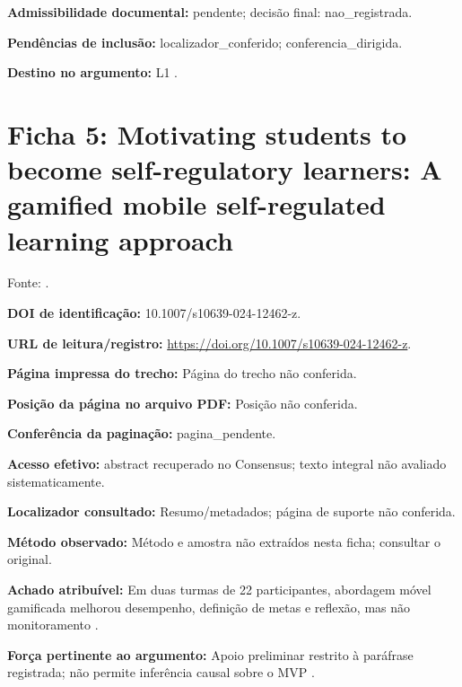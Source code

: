 \noindent\textbf{Admissibilidade documental:} pendente; decisão final: nao\_registrada.\par\medskip

\noindent\textbf{Pendências de inclusão:} localizador\_conferido; conferencia\_dirigida.\par\medskip

\noindent\textbf{Destino no argumento:} L1 .

\clearpage\section*{Ficha 5: Motivating students to become self-regulatory learners: A gamified mobile self-regulated learning approach}

Fonte: \citet{education_chen2024}.

\noindent\textbf{DOI de identificação:} 10.1007/s10639-024-12462-z.\par\medskip

\noindent\textbf{URL de leitura/registro:} \url{https://doi.org/10.1007/s10639-024-12462-z}.\par\medskip

\noindent\textbf{Página impressa do trecho:} Página do trecho não conferida.\par\medskip

\noindent\textbf{Posição da página no arquivo PDF:} Posição não conferida.\par\medskip

\noindent\textbf{Conferência da paginação:} pagina\_pendente.\par\medskip

\noindent\textbf{Acesso efetivo:} abstract recuperado no Consensus; texto integral não avaliado sistematicamente.\par\medskip

\noindent\textbf{Localizador consultado:} Resumo/metadados; página de suporte não conferida.\par\medskip

\noindent\textbf{Método observado:} Método e amostra não extraídos nesta ficha; consultar o original.\par\medskip

\noindent\textbf{Achado atribuível:} Em duas turmas de 22 participantes, abordagem móvel gamificada melhorou desempenho, definição de metas e reflexão, mas não monitoramento \citep{education_chen2024}.\par\medskip

\noindent\textbf{Força pertinente ao argumento:} Apoio preliminar restrito à paráfrase registrada; não permite inferência causal sobre o MVP \citep{education_chen2024}.\par\medskip


